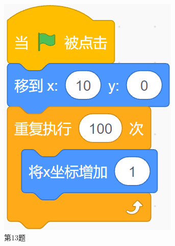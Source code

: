 \documentclass[10pt, a4paper]{article}
\begin{document}
\begin{enumerate}
        \begin{figure}[htbp]
            \centering
            \begin{minipage}[t]{.15\textwidth}
                \centering
                \includegraphics[width=\textwidth]{13.png}
                \caption*{第13题}
            \end{minipage}
            \begin{minipage}[t]{.15\textwidth}
                \centering

\end{minipage}
\end{figure}
\end{enumerate}
\end{document}
